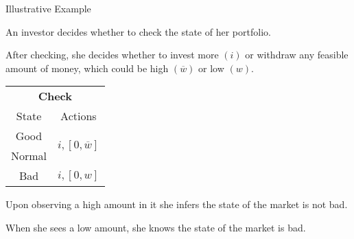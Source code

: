 \documentclass[usenames,dvipsnames,aspectratio=169,11pt, envcountsect]{beamer}
\begin{document}
\begin{frame}{Illustrative Example}

	An investor decides whether to check the state of her portfolio.

	\vfill

	After checking, she decides whether to invest more \( \left( i \right) \) or withdraw any feasible amount of money, which could be high \( \left( \overline{w} \right) \) or low \( \left( w \right) \).

	\vfill

	\begin{table}[H]
		\centering
		\begin{minipage}{0.29\textwidth}

		\end{minipage}\hspace{0.3cm} %
		\begin{minipage}{0.29\textwidth}
			\centering
			\begin{tabular}{c | c}
				\multicolumn{2}{c}{\textbf{Check}}                                                                            \\
				State                        & Actions                                                                        \\
				\hline
				{\color{bleudefrance}Good}   & \multirow{2}{*}{{\color{bleudefrance}\( i, \left[ 0, \overline{w} \right] \)}} \\
				{\color{bleudefrance}Normal} &                                                                                \\
				Bad                          & \(  i, \left[0, w \right] \)                                                   \\
			\end{tabular}
			\vspace{0.5cm} %
		\end{minipage}\hspace{0.3cm} %
		\begin{minipage}{0.29\textwidth}

		\end{minipage}
	\end{table} \pause

	\vfill

	Upon observing a high amount in it she infers the state of the market is not bad.

	\vfill

	When she sees a low amount, she knows the state of the market is bad.

\end{frame}
\end{document}
